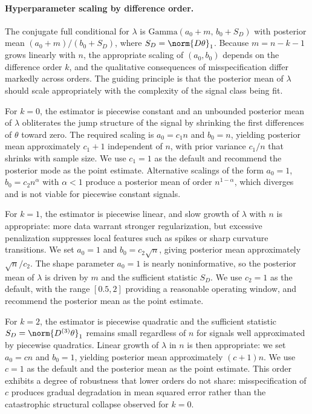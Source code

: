 \paragraph{Hyperparameter scaling by difference order.}
The conjugate full conditional for $\lambda$ is $\mathrm{Gamma}(a_0 + m,\, b_0 + S_D)$ with posterior mean $(a_0 + m)/(b_0 + S_D)$, where $S_D = \norm{D\theta}_1$. Because $m = n - k - 1$ grows linearly with $n$, the appropriate scaling of $(a_0, b_0)$ depends on the difference order $k$, and the qualitative consequences of misspecification differ markedly across orders. The guiding principle is that the posterior mean of $\lambda$ should scale appropriately with the complexity of the signal class being fit.

For $k = 0$, the estimator is piecewise constant and an unbounded posterior mean of $\lambda$ obliterates the jump structure of the signal by shrinking the first differences of $\theta$ toward zero. The required scaling is $a_0 = c_1 n$ and $b_0 = n$, yielding posterior mean approximately $c_1 + 1$ independent of $n$, with prior variance $c_1/n$ that shrinks with sample size. We use $c_1 = 1$ as the default and recommend the posterior mode as the point estimate. Alternative scalings of the form $a_0 = 1$, $b_0 = c_2 n^\alpha$ with $\alpha < 1$ produce a posterior mean of order $n^{1-\alpha}$, which diverges and is not viable for piecewise constant signals.

For $k = 1$, the estimator is piecewise linear, and slow growth of $\lambda$ with $n$ is appropriate: more data warrant stronger regularization, but excessive penalization suppresses local features such as spikes or sharp curvature transitions. We set $a_0 = 1$ and $b_0 = c_2 \sqrt{n}$, giving posterior mean approximately $\sqrt{n}/c_2$. The shape parameter $a_0 = 1$ is nearly noninformative, so the posterior mean of $\lambda$ is driven by $m$ and the sufficient statistic $S_D$. We use $c_2 = 1$ as the default, with the range $[0.5, 2]$ providing a reasonable operating window, and recommend the posterior mean as the point estimate.

For $k = 2$, the estimator is piecewise quadratic and the sufficient statistic $S_D = \norm{D^{(3)}\theta}_1$ remains small regardless of $n$ for signals well approximated by piecewise quadratics. Linear growth of $\lambda$ in $n$ is then appropriate: we set $a_0 = c n$ and $b_0 = 1$, yielding posterior mean approximately $(c+1)n$. We use $c = 1$ as the default and the posterior mean as the point estimate. This order exhibits a degree of robustness that lower orders do not share: misspecification of $c$ produces gradual degradation in mean squared error rather than the catastrophic structural collapse observed for $k = 0$.

